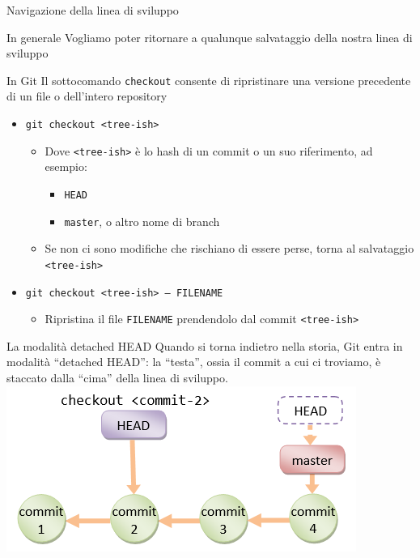 \documentclass[xcolor=dvipsnames,presentation]{beamer}
\begin{document}
\begin{frame}{Navigazione della linea di sviluppo}
    \begin{block}{In generale}
        Vogliamo poter ritornare a qualunque salvataggio della nostra linea di sviluppo
    \end{block}
    \begin{block}{In Git}
        Il sottocomando \texttt{checkout} consente di ripristinare una versione precedente di un file o dell'intero repository
        \begin{itemize}
            \item \texttt{git checkout <tree-ish>}
            \begin{itemize}
                \item Dove \texttt{<tree-ish>} è lo hash di un commit o un suo riferimento, ad esempio:
                \begin{itemize}
                    \item \texttt{HEAD}
                    \item \texttt{master}, o altro nome di branch
                \end{itemize}
                \item Se non ci sono modifiche che rischiano di essere perse, torna al salvataggio \texttt{<tree-ish>}
            \end{itemize}
            \item \texttt{git checkout <tree-ish> -- FILENAME}
            \begin{itemize}
                \item Ripristina il file \texttt{FILENAME} prendendolo dal commit \texttt{<tree-ish>}
            \end{itemize}
        \end{itemize}
    \end{block}
    \begin{block}{La modalità detached HEAD}
        Quando si torna indietro nella storia, Git entra in modalità ``detached HEAD'': la ``testa'', ossia il commit a cui ci troviamo, è staccato dalla ``cima'' della linea di sviluppo.\\
        \centering
        \includegraphics[width=.4\textwidth]{img/detached}

\end{block}
\end{frame}
\end{document}
